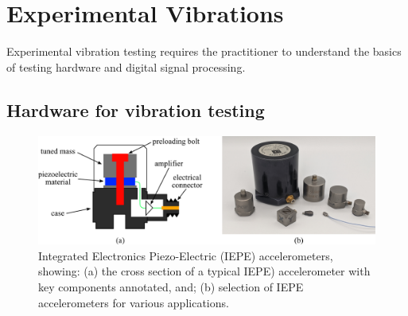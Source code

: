 \documentclass[12pt,letter]{article}
\numberwithin{ex}{section} %
\numberwithin{re}{section} %
\begin{document}
\setcounter{section}{7}	
\section{Experimental Vibrations}

Experimental vibration testing requires the practitioner to understand the basics of testing hardware and digital signal processing.

\subsection{Hardware for vibration testing}


\begin{figure}[H]
    \centering
    \includegraphics[]{../Figures/accelerometers.png}
    \caption{Integrated Electronics Piezo-Electric (IEPE) accelerometers, showing: (a) the cross section of a typical IEPE) accelerometer with key components annotated, and; (b) selection of IEPE accelerometers for various applications.}
    \label{fig:accelerometers}
\end{figure} 








\begin{table}[H]
\caption{Parameters for various IEPE accelerometers.}
\end{table}
\end{document}
